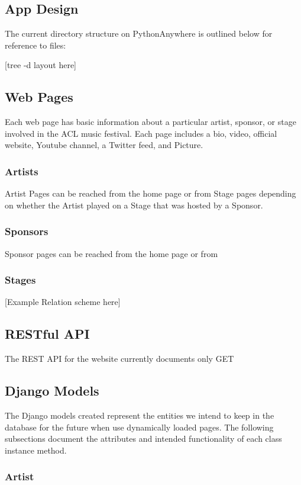 \documentclass[12pt,english]{article}
\begin{document}
\subsection{App Design}
The current directory structure on PythonAnywhere is outlined below for reference to files:

[tree -d layout here]

\subsection{Web Pages}
Each web page has basic information about a particular artist, sponsor, or stage involved in the ACL music festival.
Each page includes a bio, video, official website, Youtube channel, a Twitter feed, and Picture.
\subsubsection{Artists}
Artist Pages can be reached from the home page or from Stage pages depending on whether the Artist played on
a Stage that was hosted by a Sponsor. 
\subsubsection{Sponsors}
Sponsor pages can be reached from the home page or from 

\subsubsection{Stages}


[Example Relation scheme here]

\subsection{RESTful  API}
The REST API for the website currently documents only GET 

\subsection{Django Models}
The Django models created represent the entities we intend to keep in the database for the future when use dynamically loaded pages.
The following subsections document the attributes and intended functionality of each class instance method.
\subsubsection{Artist}
\end{document}
